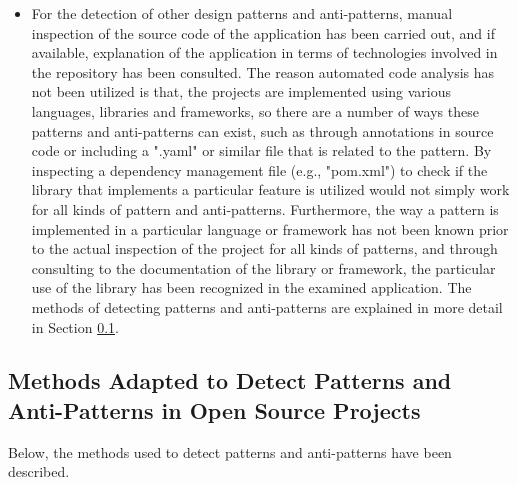 \documentclass{Configuration_Files/PoliMi3i_thesis}
\begin{document}
\begin{itemize}
    \item For the detection of other design patterns and anti-patterns, manual inspection of the source code of the application has been carried out, and if available, explanation of the application in terms of technologies involved in the repository has been consulted.
    The reason automated code analysis has not been utilized is that, the projects are implemented using various languages, libraries and frameworks, so there are a number of ways these patterns and anti-patterns can exist, such as through annotations in source code or including a ".yaml" or similar file that is related to the pattern.
    By inspecting a dependency management file (e.g., "pom.xml") to check if the library that implements a particular feature is utilized would not simply work for all kinds of pattern and anti-patterns.
    Furthermore, the way a pattern is implemented in a particular language or framework has not been known prior to the actual inspection of the project for all kinds of patterns, and through consulting to the documentation of the library or framework, the particular use of the library has been recognized in the examined application.
    The methods of detecting patterns and anti-patterns are explained in more detail in Section \ref{subsec:adopted_method_OS}.
\end{itemize}
    
\subsection{Methods Adapted to Detect Patterns and Anti-Patterns in Open Source Projects}
\label{subsec:adopted_method_OS}

Below, the methods used to detect patterns and anti-patterns have been described.
\end{document}
